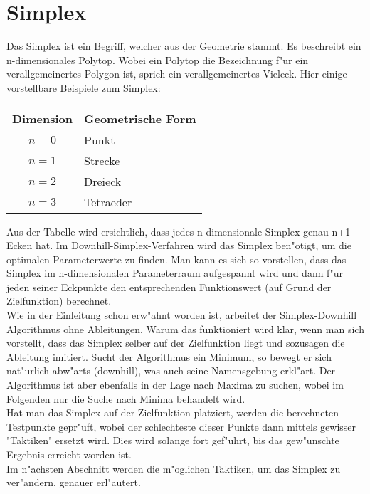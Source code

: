 \section{Simplex}
Das Simplex ist ein Begriff, welcher aus der Geometrie stammt. Es beschreibt ein n-dimensionales Polytop. Wobei ein Polytop die Bezeichnung f"ur ein verallgemeinertes Polygon ist, sprich ein verallgemeinertes Vieleck. 
Hier einige vorstellbare Beispiele zum Simplex:\\
 
\begin{tabular}{c|l}
Dimension & Geometrische Form\\
\hline
$n=0$ & Punkt\\
$n=1$ & Strecke\\
$n=2$ & Dreieck\\
$n=3$ & Tetraeder
\end{tabular} 

Aus der Tabelle wird ersichtlich, dass jedes n-dimensionale Simplex genau n+1 Ecken hat.
Im Downhill-Simplex-Verfahren wird das Simplex ben"otigt, um die optimalen Parameterwerte zu finden. Man kann es sich so vorstellen, dass das Simplex im n-dimensionalen Parameterraum aufgespannt wird und dann f"ur jeden seiner Eckpunkte den entsprechenden Funktionswert (auf Grund der Zielfunktion) berechnet. \\
Wie in der Einleitung schon erw"ahnt worden ist, arbeitet der Simplex-Downhill Algorithmus ohne Ableitungen. Warum das funktioniert wird klar, wenn man sich vorstellt, dass das Simplex selber auf der Zielfunktion liegt und sozusagen die Ableitung imitiert. Sucht der Algorithmus ein Minimum, so bewegt er sich nat"urlich abw"arts (downhill), was auch seine Namensgebung erkl"art. Der Algorithmus ist aber ebenfalls in der Lage nach Maxima zu suchen, wobei im Folgenden nur die Suche nach Minima behandelt wird.\\
Hat man das Simplex auf der Zielfunktion platziert, werden die berechneten Testpunkte gepr"uft, wobei der schlechteste dieser Punkte dann mittels gewisser "Taktiken" ersetzt wird. Dies wird solange fort gef"uhrt, bis das gew"unschte Ergebnis erreicht worden ist.\\ 
Im n"achsten Abschnitt werden die m"oglichen Taktiken, um das Simplex zu ver"andern, genauer erl"autert. 

